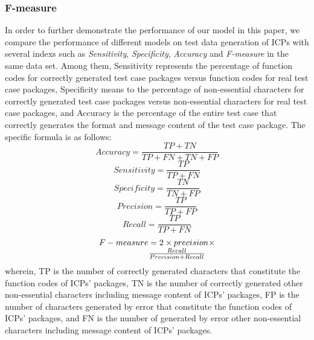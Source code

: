 \subsubsection{\textbf{F-measure}}
In order to further demonstrate the performance of our model in this paper, we compare the performance of different models on test data generation of ICPs with several indexs such as \textit{Sensitivity}, \textit{Specificity}, \textit{Accuracy} and \textit{F-measure} in the same data set.  Among them, Sensitivity represents the percentage of function codes for correctly generated test case packages versus function codes for real test case packages, Specificity means to the percentage of non-essential characters for correctly generated test case packages versus non-essential characters for real test case packages, and Accuracy is the percentage of the entire test case that correctly generates the format and message content of the test case package. The specific formula is as follows:
\begin{equation}
Accuracy = \frac{{TP + TN}}{{TP + FN + TN + FP}}
\end{equation}
\begin{equation}
Sensitivity = \frac{{TP}}{{TP + FN}}
\end{equation}
\begin{equation}
Specificity = \frac{{TN}}{{TN + FP}}
\end{equation}
\begin{equation}
Precision = \frac{{TP}}{{TP + FP}}
\end{equation}
\begin{equation}
Recall = \frac{{TP}}{{TP + FN}}
\end{equation}
\begin{equation}
\begin{array}{l}
F - measure = 2 \times precision \times \\
{\kern 1pt} {\kern 1pt} {\kern 1pt} {\kern 1pt} {\kern 1pt} {\kern 1pt} {\kern 1pt} {\kern 1pt} {\kern 1pt} {\kern 1pt} {\kern 1pt} {\kern 1pt} {\kern 1pt} {\kern 1pt} {\kern 1pt} {\kern 1pt} {\kern 1pt} {\kern 1pt} {\kern 1pt} {\kern 1pt} {\kern 1pt} {\kern 1pt} {\kern 1pt} {\kern 1pt} {\kern 1pt} {\kern 1pt} {\kern 1pt} {\kern 1pt} {\kern 1pt} {\kern 1pt} {\kern 1pt} {\kern 1pt} {\kern 1pt} {\kern 1pt} {\kern 1pt} {\kern 1pt} {\kern 1pt} {\kern 1pt} {\kern 1pt} {\kern 1pt} {\kern 1pt} {\kern 1pt} {\kern 1pt} {\kern 1pt} {\kern 1pt} {\kern 1pt} {\kern 1pt} {\kern 1pt} {\kern 1pt} {\kern 1pt} {\kern 1pt} {\kern 1pt} {\kern 1pt} {\kern 1pt} {\kern 1pt} {\kern 1pt} {\kern 1pt} {\kern 1pt} {\kern 1pt} \frac{{Recall}}{{Precision + Recall}}
\end{array}
\end{equation}
wherein, TP is the number of correctly generated characters that constitute the function codes of ICPs' packages, TN is the number of correctly generated other non-essential characters including message content of ICPs' packages, FP is the number of characters  generated by error that constitute the function codes of ICPs' packages, and FN is the number of generated by error other non-essential characters including message content of ICPs' packages.

